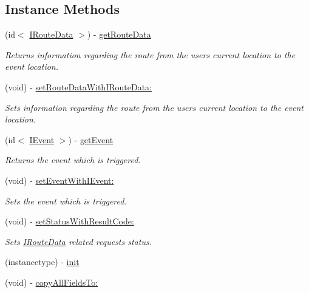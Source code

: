 \subsection*{Instance Methods}
\begin{DoxyCompactItemize}
\item 
(id$<$ \hyperlink{protocol_i_route_data-p}{I\+Route\+Data} $>$) -\/ \hyperlink{interface_t_s_o_event_triggered_msg_a30a12cce58d0255b5605ed281bb964b7}{get\+Route\+Data}
\begin{DoxyCompactList}\small\item\em Returns information regarding the route from the user\textquotesingle{}s current location to the event location. \end{DoxyCompactList}\item 
(void) -\/ \hyperlink{interface_t_s_o_event_triggered_msg_afe2c5693616ab42116d90f8aae57bc5d}{set\+Route\+Data\+With\+I\+Route\+Data\+:}
\begin{DoxyCompactList}\small\item\em Sets information regarding the route from the user\textquotesingle{}s current location to the event location. \end{DoxyCompactList}\item 
(id$<$ \hyperlink{protocol_i_event-p}{I\+Event} $>$) -\/ \hyperlink{interface_t_s_o_event_triggered_msg_af6136fc0726f7ec75ce9da41e2405774}{get\+Event}
\begin{DoxyCompactList}\small\item\em Returns the event which is triggered. \end{DoxyCompactList}\item 
(void) -\/ \hyperlink{interface_t_s_o_event_triggered_msg_ac04c2407ff0c83437fd2513ee2cee3df}{set\+Event\+With\+I\+Event\+:}
\begin{DoxyCompactList}\small\item\em Sets the event which is triggered. \end{DoxyCompactList}\item 
(void) -\/ \hyperlink{interface_t_s_o_event_triggered_msg_a1b5fe9f73b1b21c213f726c0c2b3c476}{set\+Status\+With\+Result\+Code\+:}
\begin{DoxyCompactList}\small\item\em Sets \hyperlink{protocol_i_route_data-p}{I\+Route\+Data} related requests status. \end{DoxyCompactList}\item 
(instancetype) -\/ \hyperlink{interface_t_s_o_event_triggered_msg_a200ba418c5580e2e72a035957e16bb7d}{init}
\item 
(void) -\/ \hyperlink{interface_t_s_o_event_triggered_msg_aa703a9403a6e2b3c8be3781cb44078e0}{copy\+All\+Fields\+To\+:}
\end{DoxyCompactItemize}
